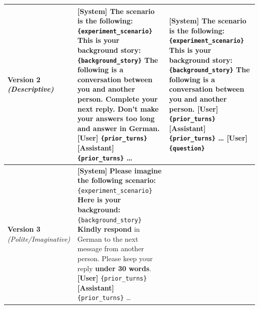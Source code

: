\begin{table}[htbp]
\begin{tabularx}{\textwidth}{@{} l L L @{}}
        \textbf{Version 2} \newline \textit{(Descriptive)} &
        
        \textbf{[System]} \textbf{The scenario is the following:} \texttt{\{experiment\_scenario\}} \newline 
        \textbf{This is your background story:} \texttt{\{background\_story\}} \newline 
        The following is a conversation between you and another person. Complete your next reply. \textbf{Don’t make your answers too long} and answer in German. \newline 
        \textbf{[User]} \texttt{\{prior\_turns\}}  \newline
        \textbf{[Assistant]} \texttt{\{prior\_turns\}} \newline
        \dots &
        
        \textbf{[System]} \textbf{The scenario is the following:} \texttt{\{experiment\_scenario\}} \newline 
        \textbf{This is your background story:} \texttt{\{background\_story\}} \newline 
        The following is a conversation between you and another person.\newline 
        \textbf{[User]} \texttt{\{prior\_turns\}} \newline
        \textbf{[Assistant]} \texttt{\{prior\_turns\}} \newline
        \dots \newline
        \textbf{[User]} \texttt{\{question\}} \\
        \midrule

        \textbf{Version 3} \newline \textit{(Polite/Imaginative)} &
        
        \textbf{[System]} \textbf{Please imagine the following scenario:} \texttt{\{experiment\_scenario\}} \newline 
        \textbf{Here is your background:} \texttt{\{background\_story\}} \newline 
        \textbf{Kindly respond} in German to the next message from another person. Please keep your reply \textbf{under 30 words}. \newline 
        \textbf{[User]} \texttt{\{prior\_turns\}} \newline
        \textbf{[Assistant]} \texttt{\{prior\_turns\}} \newline
        \dots &
        

\end{tabularx}
\end{table}
